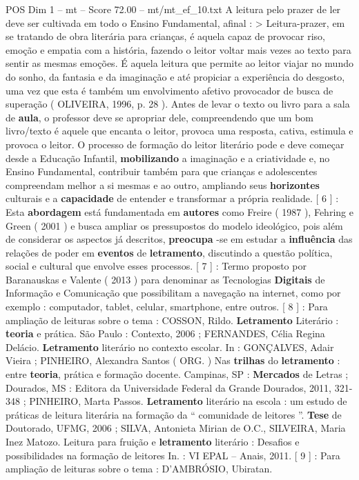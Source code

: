 \begin{textsample}{POS Dim 1 – mt – Score 72.00 – mt/mt\_ef\_10.txt}
A leitura pelo prazer de ler deve ser cultivada em todo o Ensino Fundamental, afinal : > Leitura-prazer, em se tratando de obra literária para crianças, é aquela capaz de provocar riso, emoção e empatia com a história, fazendo o leitor voltar mais vezes ao texto para sentir as mesmas emoções.
É aquela leitura que permite ao leitor viajar no mundo do sonho, da fantasia e da imaginação e até propiciar a experiência do desgosto, uma vez que esta é também um envolvimento afetivo provocador de busca de superação ( OLIVEIRA, 1996, p. 28 ).
Antes de levar o texto ou livro para a sala de \textbf{aula}, o professor deve se apropriar dele, compreendendo que um bom livro/texto é aquele que encanta o leitor, provoca uma resposta, cativa, estimula e provoca o leitor.
O processo de formação do leitor literário pode e deve começar desde a Educação Infantil, \textbf{mobilizando} a imaginação e a criatividade e, no Ensino Fundamental, contribuir também para que crianças e adolescentes compreendam melhor a si mesmas e ao outro, ampliando seus \textbf{horizontes} culturais e a \textbf{capacidade} de entender e transformar a própria realidade. [ 6 ] : Esta \textbf{abordagem} está fundamentada em \textbf{autores} como Freire ( 1987 ), Fehring e Green ( 2001 ) e busca ampliar os pressupostos do modelo ideológico, pois além de considerar os aspectos já descritos, \textbf{preocupa} -se em estudar a \textbf{influência} das relações de poder em \textbf{eventos} de \textbf{letramento}, discutindo a questão política, social e cultural que envolve esses processos. [ 7 ] : Termo proposto por Baranauskas e Valente ( 2013 ) para denominar as Tecnologias \textbf{Digitais} de Informação e Comunicação que possibilitam a navegação na internet, como por exemplo : computador, tablet, celular, smartphone, entre outros. [ 8 ] : Para ampliação de leituras sobre o tema : COSSON, Rildo. \textbf{Letramento} Literário : \textbf{teoria} e prática.
São Paulo : Contexto, 2006 ; FERNANDES, Célia Regina Delácio. \textbf{Letramento} literário no contexto escolar.
In : GONÇALVES, Adair Vieira ; PINHEIRO, Alexandra Santos ( ORG. ) Nas \textbf{trilhas} do \textbf{letramento} : entre \textbf{teoria}, prática e formação docente.
Campinas, SP : \textbf{Mercados} de Letras ; Dourados, MS : Editora da Universidade Federal da Grande Dourados, 2011, 321-348 ; PINHEIRO, Marta Passos. \textbf{Letramento} literário na escola : um estudo de práticas de leitura literária na formação da “ comunidade de leitores ”. \textbf{Tese} de Doutorado, UFMG, 2006 ; SILVA, Antonieta Mirian de O.C., SILVEIRA, Maria Inez Matozo.
Leitura para fruição e \textbf{letramento} literário : Desafios e possibilidades na formação de leitores In. : VI EPAL – Anais, 2011. [ 9 ] : Para ampliação de leituras sobre o tema : D'AMBRÓSIO, Ubiratan.

\end{textsample}
